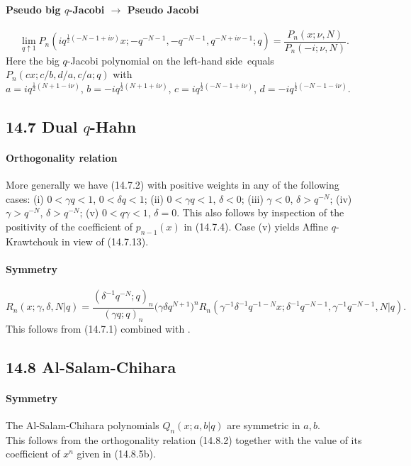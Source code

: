 \documentclass[twoside,11pt]{article}
\newcommand\sa{\smallskipamount}
\newcommand\sLP{\\[\sa]}
\newcommand\ga\gamma
\newcommand\de\delta
\newcommand\half{\frac12}
\newcommand\LHS{left-hand side}
\begin{document}
\paragraph{Pseudo big $q$-Jacobi $\longrightarrow$ Pseudo Jacobi}
\begin{equation}
\lim_{q\uparrow1}P_n(iq^{\half(-N-1+i\nu)}x;-q^{-N-1},-q^{-N-1},q^{-N+i\nu-1};q)
=\frac{P_n(x;\nu,N)}{P_n(-i;\nu,N)} .
\label{118}
\end{equation}
Here the big $q$-Jacobi polynomial on the \LHS\ equals
$P_n(cx;c/b,d/a,c/a;q)$ with\\
$a=iq^{\half(N+1-i\nu)}$, $b=-iq^{\half(N+1+i\nu)}$,
$c=iq^{\half(-N-1+i\nu)}$, $d=-iq^{\half(-N-1-i\nu)}$.
%
\subsection*{14.7 Dual $q$-Hahn}
\label{sec14.7}
\paragraph{Orthogonality relation}
More generally we have (14.7.2) with positive weights in any of the following
cases:
(i) $0<\ga q<1$, $0<\de q<1$;\quad
(ii) $0<\ga q<1$, $\de<0$;\quad
(iii) $\ga<0$, $\de>q^{-N}$;\quad
(iv) $\ga>q^{-N}$, $\de>q^{-N}$;\quad
(v) $0<q\ga<1$, $\de=0$.
This also follows by inspection of the positivity of the coefficient of
$p_{n-1}(x)$ in (14.7.4).
Case (v) yields Affine $q$-Krawtchouk in view of (14.7.13).
%
\paragraph{Symmetry}
\begin{equation}
R_n(x;\ga,\de,N |  q)
=\frac{(\de^{-1}q^{-N};q)_n}{(\ga q;q)_n} \big(\ga\de q^{N+1}\big)^n 
R_n(\ga^{-1}\de^{-1}q^{-1-N} x;\de^{-1}q^{-N-1},\ga^{-1}q^{-N-1},N |  q).
\label{89}
\end{equation}
This follows from (14.7.1) combined with .
%
\subsection*{14.8 Al-Salam-Chihara}
\label{sec14.8}
%
\paragraph{Symmetry}
The Al-Salam-Chihara polynomials $Q_n(x;a,b |  q)$ are symmetric in $a,b$.
\sLP
This follows from the orthogonality relation (14.8.2)
together with the value of its coefficient of $x^n$ given in (14.8.5b).
%
\end{document}
